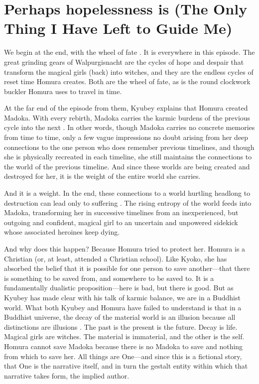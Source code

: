 \chapter{Perhaps hopelessness is (The Only Thing I Have Left to Guide Me)}
We begin at the end, with the wheel of fate \cite{ref78}. It is everywhere in this episode. The great grinding gears of Walpurgisnacht are the cycles of hope and despair that transform the magical girls (back) into witches, and they are the endless cycles of reset time Homura creates. Both are the wheel of fate, as is the round clockwork buckler Homura uses to travel in time.

At the far end of the episode from them, Kyubey explains that Homura created Madoka. With every rebirth, Madoka carries the karmic burdens of the previous cycle into the next \cite{ref79}. In other words, though Madoka carries no concrete memories from time to time, only a few vague impressions no doubt arising from her deep connections to the one person who does remember previous timelines, and though she is physically recreated in each timeline, she still maintains the connections to the world of the previous timeline. And since these worlds are being created and destroyed for her, it is the weight of the entire world she carries. 

And it is a weight. In the end, these connections to a world hurtling headlong to destruction can lead only to suffering \cite{ref80}. The rising entropy of the world feeds into Madoka, transforming her in successive timelines from an inexperienced, but outgoing and confident, magical girl to an uncertain and unpowered sidekick whose associated heroines keep dying. 

And why does this happen? Because Homura tried to protect her. Homura is a Christian (or, at least, attended a Christian school). Like Kyoko, she has absorbed the belief that it is possible for one person to save another—that there is something to be saved from, and somewhere to be saved to. It is a fundamentally dualistic proposition—here is bad, but there is good. But as Kyubey has made clear with his talk of karmic balance, we are in a Buddhist world. What both Kyubey and Homura have failed to understand is that in a Buddhist universe, the decay of the material world is an illusion because all distinctions are illusions \cite{ref81}. The past is the present is the future. Decay is life. Magical girls are witches. The material is immaterial, and the other is the self. Homura cannot save Madoka because there is no Madoka to save and nothing from which to save her. All things are One—and since this is a fictional story, that One is the narrative itself, and in turn the gestalt entity within which that narrative takes form, the implied author.

